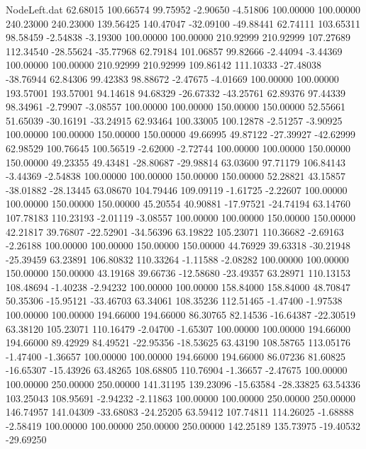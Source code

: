 \begin{filecontents}{NodeLeft.dat}
  62.68015  100.66574   99.75952    -2.90650   -4.51806  100.00000  100.00000  240.23000  240.23000  139.56425  140.47047  -32.09100  -49.88441
  62.74111  103.65311   98.58459    -2.54838   -3.19300  100.00000  100.00000  210.92999  210.92999  107.27689  112.34540  -28.55624  -35.77968
  62.79184  101.06857   99.82666    -2.44094   -3.44369  100.00000  100.00000  210.92999  210.92999  109.86142  111.10333  -27.48038  -38.76944
  62.84306   99.42383   98.88672    -2.47675   -4.01669  100.00000  100.00000  193.57001  193.57001   94.14618   94.68329  -26.67332  -43.25761
  62.89376   97.44339   98.34961    -2.79907   -3.08557  100.00000  100.00000  150.00000  150.00000   52.55661   51.65039  -30.16191  -33.24915
  62.93464  100.33005  100.12878    -2.51257   -3.90925  100.00000  100.00000  150.00000  150.00000   49.66995   49.87122  -27.39927  -42.62999
  62.98529  100.76645  100.56519    -2.62000   -2.72744  100.00000  100.00000  150.00000  150.00000   49.23355   49.43481  -28.80687  -29.98814
  63.03600   97.71179  106.84143    -3.44369   -2.54838  100.00000  100.00000  150.00000  150.00000   52.28821   43.15857  -38.01882  -28.13445
  63.08670  104.79446  109.09119    -1.61725   -2.22607  100.00000  100.00000  150.00000  150.00000   45.20554   40.90881  -17.97521  -24.74194
  63.14760  107.78183  110.23193    -2.01119   -3.08557  100.00000  100.00000  150.00000  150.00000   42.21817   39.76807  -22.52901  -34.56396
  63.19822  105.23071  110.36682    -2.69163   -2.26188  100.00000  100.00000  150.00000  150.00000   44.76929   39.63318  -30.21948  -25.39459
  63.23891  106.80832  110.33264    -1.11588   -2.08282  100.00000  100.00000  150.00000  150.00000   43.19168   39.66736  -12.58680  -23.49357
  63.28971  110.13153  108.48694    -1.40238   -2.94232  100.00000  100.00000  158.84000  158.84000   48.70847   50.35306  -15.95121  -33.46703
  63.34061  108.35236  112.51465    -1.47400   -1.97538  100.00000  100.00000  194.66000  194.66000   86.30765   82.14536  -16.64387  -22.30519
  63.38120  105.23071  110.16479    -2.04700   -1.65307  100.00000  100.00000  194.66000  194.66000   89.42929   84.49521  -22.95356  -18.53625
  63.43190  108.58765  113.05176    -1.47400   -1.36657  100.00000  100.00000  194.66000  194.66000   86.07236   81.60825  -16.65307  -15.43926
  63.48265  108.68805  110.76904    -1.36657   -2.47675  100.00000  100.00000  250.00000  250.00000  141.31195  139.23096  -15.63584  -28.33825
  63.54336  103.25043  108.95691    -2.94232   -2.11863  100.00000  100.00000  250.00000  250.00000  146.74957  141.04309  -33.68083  -24.25205
  63.59412  107.74811  114.26025    -1.68888   -2.58419  100.00000  100.00000  250.00000  250.00000  142.25189  135.73975  -19.40532  -29.69250

\end{filecontents}
